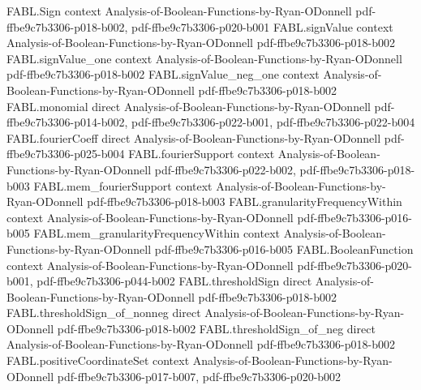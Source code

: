 \begin{theorem}
\label{FABL.discreteDerivative_monomial}
\leanok
{}
\proofstep
  {FABL.Sign}
  {context}
  {Analysis-of-Boolean-Functions-by-Ryan-ODonnell}
  {pdf-ffbe9c7b3306-p018-b002,
    pdf-ffbe9c7b3306-p020-b001}
\proofstep
  {FABL.signValue}
  {context}
  {Analysis-of-Boolean-Functions-by-Ryan-ODonnell}
  {pdf-ffbe9c7b3306-p018-b002}
\proofstep
  {FABL.signValue_one}
  {context}
  {Analysis-of-Boolean-Functions-by-Ryan-ODonnell}
  {pdf-ffbe9c7b3306-p018-b002}
\proofstep
  {FABL.signValue_neg_one}
  {context}
  {Analysis-of-Boolean-Functions-by-Ryan-ODonnell}
  {pdf-ffbe9c7b3306-p018-b002}
\proofstep
  {FABL.monomial}
  {direct}
  {Analysis-of-Boolean-Functions-by-Ryan-ODonnell}
  {pdf-ffbe9c7b3306-p014-b002,
    pdf-ffbe9c7b3306-p022-b001,
    pdf-ffbe9c7b3306-p022-b004}
\proofstep
  {FABL.fourierCoeff}
  {direct}
  {Analysis-of-Boolean-Functions-by-Ryan-ODonnell}
  {pdf-ffbe9c7b3306-p025-b004}
\proofstep
  {FABL.fourierSupport}
  {context}
  {Analysis-of-Boolean-Functions-by-Ryan-ODonnell}
  {pdf-ffbe9c7b3306-p022-b002,
    pdf-ffbe9c7b3306-p018-b003}
\proofstep
  {FABL.mem_fourierSupport}
  {context}
  {Analysis-of-Boolean-Functions-by-Ryan-ODonnell}
  {pdf-ffbe9c7b3306-p018-b003}
\proofstep
  {FABL.granularityFrequencyWithin}
  {context}
  {Analysis-of-Boolean-Functions-by-Ryan-ODonnell}
  {pdf-ffbe9c7b3306-p016-b005}
\proofstep
  {FABL.mem_granularityFrequencyWithin}
  {context}
  {Analysis-of-Boolean-Functions-by-Ryan-ODonnell}
  {pdf-ffbe9c7b3306-p016-b005}
\proofstep
  {FABL.BooleanFunction}
  {context}
  {Analysis-of-Boolean-Functions-by-Ryan-ODonnell}
  {pdf-ffbe9c7b3306-p020-b001,
    pdf-ffbe9c7b3306-p044-b002}
\proofstep
  {FABL.thresholdSign}
  {direct}
  {Analysis-of-Boolean-Functions-by-Ryan-ODonnell}
  {pdf-ffbe9c7b3306-p018-b002}
\proofstep
  {FABL.thresholdSign_of_nonneg}
  {direct}
  {Analysis-of-Boolean-Functions-by-Ryan-ODonnell}
  {pdf-ffbe9c7b3306-p018-b002}
\proofstep
  {FABL.thresholdSign_of_neg}
  {direct}
  {Analysis-of-Boolean-Functions-by-Ryan-ODonnell}
  {pdf-ffbe9c7b3306-p018-b002}
\proofstep
  {FABL.positiveCoordinateSet}
  {context}
  {Analysis-of-Boolean-Functions-by-Ryan-ODonnell}
  {pdf-ffbe9c7b3306-p017-b007,
    pdf-ffbe9c7b3306-p020-b002}

\end{theorem}
